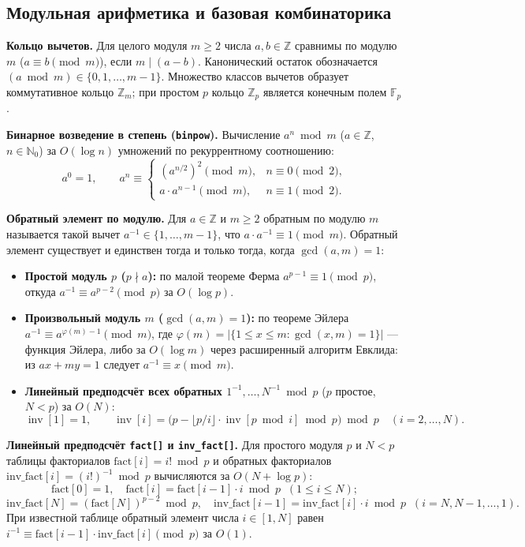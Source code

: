 \documentclass[10pt,a4paper]{article}
\renewcommand{\le}{\leqslant}
\renewcommand{\ge}{\geqslant}
\newcommand{\N}{\mathbb{N}}
\newcommand{\Z}{\mathbb{Z}}
\newcommand{\F}{\mathbb{F}}
\DeclareMathOperator{\inv}{inv}
\begin{document}
\subsection{Модульная арифметика и базовая комбинаторика}

\textbf{Кольцо вычетов.} Для целого модуля $m \ge 2$ числа $a, b \in \Z$ сравнимы по модулю $m$ ($a \equiv b \pmod m$), если $m \mid (a - b)$. Канонический остаток обозначается $(a \bmod m) \in \{0, 1, \dots, m - 1\}$. Множество классов вычетов образует коммутативное кольцо $\Z_m$; при простом $p$ кольцо $\Z_p$ является конечным полем $\F_p$.

\textbf{Бинарное возведение в степень (\texttt{binpow}).} Вычисление $a^n \bmod m$ ($a \in \Z$, $n \in \N_0$) за $O(\log n)$ умножений по рекуррентному соотношению:
\[
  a^0 = 1, \qquad
  a^n \equiv
  \begin{cases}
    (a^{n/2})^2 \pmod m, & n \equiv 0 \pmod 2, \\
    a \cdot a^{n-1} \pmod m, & n \equiv 1 \pmod 2.
  \end{cases}
\]

\textbf{Обратный элемент по модулю.} Для $a \in \Z$ и $m \ge 2$ обратным по модулю $m$ называется такой вычет $a^{-1} \in \{1, \dots, m - 1\}$, что $a \cdot a^{-1} \equiv 1 \pmod m$. Обратный элемент существует и единствен тогда и только тогда, когда $\gcd(a, m) = 1$:
\begin{itemize}
  \item \textbf{Простой модуль $p$ ($p \nmid a$):} по малой теореме Ферма $a^{p-1} \equiv 1 \pmod p$, откуда $a^{-1} \equiv a^{p-2} \pmod p$ за $O(\log p)$.
  \item \textbf{Произвольный модуль $m$ ($\gcd(a, m) = 1$):} по теореме Эйлера $a^{-1} \equiv a^{\varphi(m)-1} \pmod m$, где $\varphi(m) = |\{1 \le x \le m : \gcd(x, m) = 1\}|$ — функция Эйлера, либо за $O(\log m)$ через расширенный алгоритм Евклида: из $ax + my = 1$ следует $a^{-1} \equiv x \pmod m$.
  \item \textbf{Линейный предподсчёт всех обратных $1^{-1}, \dots, N^{-1} \bmod p$} ($p$ простое, $N < p$) за $O(N)$:
  \[
    \inv[1] = 1, \qquad \inv[i] = \bigl(p - \lfloor p / i \rfloor \cdot \inv[p \bmod i] \bmod p\bigr) \bmod p \quad (i = 2, \dots, N).
  \]
\end{itemize}

\textbf{Линейный предподсчёт \texttt{fact[]} и \texttt{inv\_fact[]}.} Для простого модуля $p$ и $N < p$ таблицы факториалов $\mathrm{fact}[i] = i! \bmod p$ и обратных факториалов $\mathrm{inv\_fact}[i] = (i!)^{-1} \bmod p$ вычисляются за $O(N + \log p)$:
\[
  \mathrm{fact}[0] = 1,\quad \mathrm{fact}[i] = \mathrm{fact}[i-1] \cdot i \bmod p \;\;(1 \le i \le N);
\]
\[
  \mathrm{inv\_fact}[N] = (\mathrm{fact}[N])^{p-2} \bmod p,\quad
  \mathrm{inv\_fact}[i-1] = \mathrm{inv\_fact}[i] \cdot i \bmod p \;\;(i = N, N-1, \dots, 1).
\]
При известной таблице обратный элемент числа $i \in [1, N]$ равен $i^{-1} \equiv \mathrm{fact}[i-1] \cdot \mathrm{inv\_fact}[i] \pmod p$ за $O(1)$.
\end{document}
